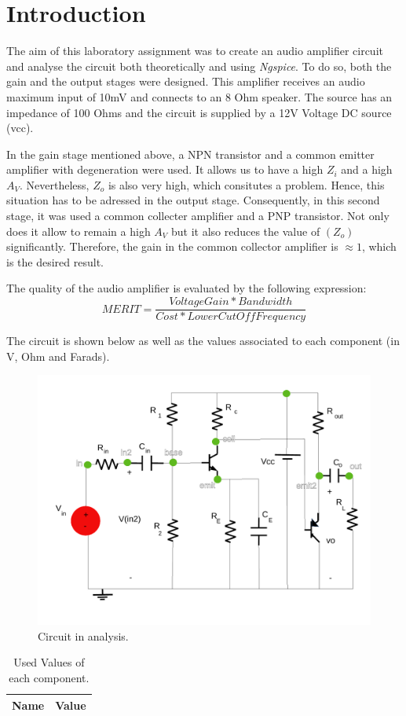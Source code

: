 \section{Introduction}
\label{introduction}


\par The aim of this laboratory assignment was to create an audio amplifier circuit and analyse the circuit both theoretically and using \textit{Ngspice}. To do so, both the gain and the output stages were designed. This amplifier receives an audio maximum input of 10mV and connects to an 8 Ohm speaker. The source has an impedance of 100 Ohms and the circuit is supplied by a 12V Voltage DC source (vcc).
\par In the gain stage mentioned above, a NPN transistor and a common emitter amplifier with degeneration were used. It allows us to have a high $Z_{i}$ and a high $A_{V}$. Nevertheless, $Z_{o}$ is also very high, which consitutes a problem. Hence, this situation has to be adressed in the output stage. Consequently, in this second stage, it was used a common collecter amplifier and a PNP transistor. Not only does it allow to remain a high $A_{V}$ but it also reduces the value of $(Z_{o})$ significantly. Therefore, the gain in the common collector amplifier is $\approx 1$, which is the desired result.

\par The quality of the audio amplifier is evaluated by the following expression:
\begin {equation}
	 MERIT = \frac{Voltage Gain*Bandwidth}{Cost*Lower Cut Off Frequency}   	
	\label{merit}
\end{equation}

The circuit is shown below as well as the values associated to each component (in V, Ohm and Farads).

\begin{figure}[ht] \centering
\includegraphics[width=0.5\linewidth]{lab4.pdf}
\caption{Circuit in analysis.}
\label{circuito todo}
\end{figure}


\begin{table}[ht]
  \centering
  \begin{tabular}{|l|r|}
    \hline    
    {\bf Name} & {\bf Value} \\ \hline
    
  \end{tabular}
  \caption{Used Values of each component.}
  \label{tab:3}
\end{table}


\newpage


